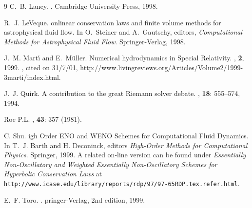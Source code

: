 \documentclass{article}
\begin{document}
\begin{thebibliography}{9}
C.~B. Laney.
.
\newblock Cambridge University Press, 1998.

R.~J. LeVeque.
onlinear conservation laws and finite volume methods for
  astrophysical fluid flow.
\newblock In O.~Steiner and A.~Gautschy, editors, {\em {C}omputational
  {M}ethods for {A}strophysical {F}luid {F}low}. Springer-Verlag, 1998.

J.~M. Mart{\'{\i}} and E.~M{\"u}ller.
\newblock Numerical hydrodynamics in {S}pecial {R}elativity.
, {\bf 2}, 1999.
, cited on 31/7/01,
  http://www.livingreviews.org/Articles/Volume2/1999-3marti/index.html.

J.~J. Quirk.
\newblock A contribution to the great {R}iemann solver debate.
, {\bf 18}: 555--574,
  1994.

Roe P.L.
, {\bf 43}: 357 (1981).

C. Shu.
igh {O}rder {ENO} and {WENO} {S}chemes for
{C}omputational {F}luid {D}ynamics.
\newblock In T.~J. Barth and H. Deconinck, editors {\em High-Order
  Methods for Computational Physics}. Springer, 1999.
\newblock A related on-line version can be found under {\em Essentially
  {N}on-{O}scillatory and {W}eighted {E}ssentially {N}on-{O}scillatory
  {S}chemes for {H}yperbolic {C}onservation {L}aws} at {\tt
  http://www.icase.edu/library/reports/rdp/97/97-65RDP.tex.refer.html}. 

E.~F. Toro.
.
pringer-{V}erlag, 2nd edition, 1999.

\end{thebibliography}

\end{document}
